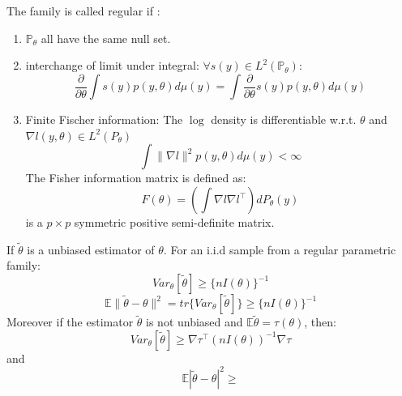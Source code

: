 \begin{definition}
The family is called regular if :
\begin{enumerate}
	\item $\mathbb{P}_{\theta}$ all have the same null set.
	\item interchange of limit under integral: $\forall s(y) \in L^2(\mathbb{P_\theta})$:
	\begin{equation*}
		\frac{\partial}{\partial \theta} \int s(y) p(y, \theta) d\mu(y) = \int \frac{\partial}{\partial \theta} s(y) p(y, \theta) d\mu(y) 
	\end{equation*}
	\item Finite Fischer information: The $\log$ density is differentiable w.r.t. $\theta$ and $\nabla l(y, \theta) \in L^2(P_\theta)$
	\begin{equation*}
		\int \|\nabla l\| ^2 p(y, \theta) d\mu(y) < \infty
	\end{equation*}
	The Fisher information matrix is defined as:
	\begin{equation*}
		F(\theta) = (\int \nabla l \nabla l^\top) dP_\theta(y)
	\end{equation*}
	is a $p \times p$ symmetric positive semi-definite matrix.
\end{enumerate}	
\end{definition}


\begin{theorem}
	If $\tilde{\theta}$ is a unbiased estimator of $\theta$. For an i.i.d sample from a regular parametric family:
	\begin{equation*}
		Var_\theta[\tilde{\theta}] \geq \{ n I(\theta)\}^{-1} 
	\end{equation*}
	\begin{equation*}
		\mathbb{E} \| \tilde{\theta} - \theta \|^2 = tr\{ Var_\theta[\tilde{\theta}]\} \geq \{n I(\theta)\}^{-1} 
	\end{equation*}
	Moreover if the estimator $\tilde{\theta}$ is not unbiased and $\mathbb{E}\tilde{\theta} =\tau(\theta)$, then:
	\begin{equation*}
		Var_\theta[\tilde{\theta}] \geq \nabla \tau^\top (nI(\theta))^{-1} \nabla \tau
	\end{equation*}
	and 
	\begin{equation*}
		\mathbb{E} |\tilde{\theta} - \theta|^2 \geq
	\end{equation*}
\end{theorem}

